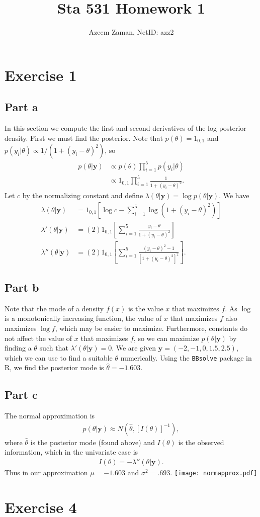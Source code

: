 \documentclass[a4paper,10pt]{article}
\title{Sta 531 Homework 1}
\author{Azeem Zaman, NetID: azz2}
\newcommand{\by}{\mathbf{y}}
\begin{document}
\maketitle


\section{Exercise 1}
\subsection{Part a}
In this section we compute the first and second derivatives of the log posterior density.  First we must find the posterior.  Note that $p(\theta) = 1_{0,1}$ and $p(y_i|\theta) \propto 1/(1+(y_i-\theta)^2)$, so
\begin{align*}
 p(\theta|\by) &\propto p(\theta)\prod_{i=1}^5{p(y_i|\theta)} \\
 &\propto 1_{0,1}\prod_{i=1}^5{\frac{1}{1+(y_i-\theta)^2}}.
\end{align*}
Let $c$ by the normalizing constant and define $\lambda(\theta|\by)=\log{p(\theta|\by)}$. We have
\begin{align*}
 \lambda(\theta|\by) &= 1_{0,1}\left[\log{c}-\sum_{i=1}^5{\log(1 + (y_i - \theta)^2)}\right] \\
 \lambda'(\theta|\by) &= (2)1_{0,1}\left[\sum_{i=1}^5\frac{y_i - \theta}{1 + (y_i - \theta)^2}\right] \\
 \lambda''(\theta|\by) &= (2)1_{0,1}\left[\sum_{i=1}^5\frac{(y_i-\theta)^2-1}{\left[1+(y_i-\theta)^2\right]^2}\right].
\end{align*}
\subsection{Part b}
Note that the mode of a density $f(x)$ is the value $x$ that maximizes $f$.  As $\log$ is a monotonically increasing function, the value of $x$ that maximizes $f$ also maximizes $\log{f}$, which may be easier to maximize.  Furthermore, constants do not affect the value of $x$ that maximizes $f$, so we can maximize $p(\theta|\by)$ by finding a $\theta$ such that $\lambda'(\theta|\by) = 0$.  We are given $\by = (-2,-1,0,1.5,2.5)$, which we can use to find a suitable $\theta$ numerically.  Using the \texttt{BBsolve} package in R, we find the posterior mode is $\hat{\theta} = -1.603$.  

\subsection{Part c}
The normal approximation is
\begin{align*}
 p(\theta|\by) \approx N(\hat{\theta}, [I(\theta)]^{-1}),
\end{align*}
where $\hat{\theta}$ is the posterior mode (found above) and $I(\theta)$ is the observed information, which in the univariate case is
\begin{align*}
 I(\theta) = -\lambda''(\theta|\by).
\end{align*}
Thus in our approximation $\mu = -1.603$ and $\sigma^2 = .693$.  
\centering
\texttt{[image: normapprox.pdf]}


\section{Exercise 4}
\end{document}
